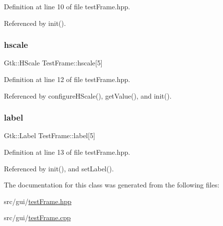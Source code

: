 Definition at line 10 of file test\+Frame.\+hpp.



Referenced by init().

\mbox{\label{class_test_frame_ac85dadacc49bc00afc3df6c60635c1e3}} 
\subsubsection{\texorpdfstring{hscale}{hscale}}
{\footnotesize\ttfamily Gtk\+::\+H\+Scale Test\+Frame\+::hscale\mbox{[}5\mbox{]}\hspace{0.3cm}{\ttfamily [private]}}



Definition at line 12 of file test\+Frame.\+hpp.



Referenced by configure\+H\+Scale(), get\+Value(), and init().

\mbox{\label{class_test_frame_a0fb8c663f048dc69899409a61bd22025}} 
\subsubsection{\texorpdfstring{label}{label}}
{\footnotesize\ttfamily Gtk\+::\+Label Test\+Frame\+::label\mbox{[}5\mbox{]}\hspace{0.3cm}{\ttfamily [private]}}



Definition at line 13 of file test\+Frame.\+hpp.



Referenced by init(), and set\+Label().



The documentation for this class was generated from the following files\+:\begin{DoxyCompactItemize}
\item 
src/gui/\hyperlink{test_frame_8hpp}{test\+Frame.\+hpp}\item 
src/gui/\hyperlink{test_frame_8cpp}{test\+Frame.\+cpp}\end{DoxyCompactItemize}
